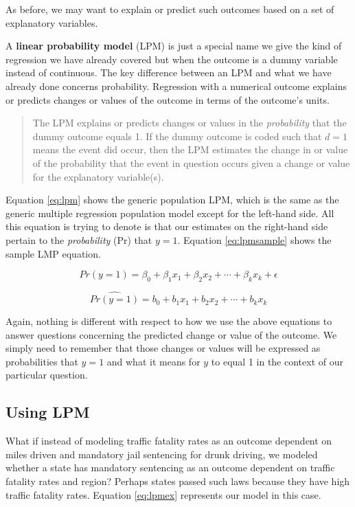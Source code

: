 \documentclass[
]{book}
\begin{document}
As before, we may want to explain or predict such outcomes based on a set of explanatory variables.

A \textbf{linear probability model} (LPM) is just a special name we give the kind of regression we have already covered but when the outcome is a dummy variable instead of continuous. The key difference between an LPM and what we have already done concerns probability. Regression with a numerical outcome explains or predicts changes or values of the outcome in terms of the outcome's units.

\begin{quote}
The LPM explains or predicts changes or values in the \emph{probability} that the dummy outcome equals 1. If the dummy outcome is coded such that \(d=1\) means the event did occur, then the LPM estimates the change in or value of the probability that the event in question occurs given a change or value for the explanatory variable(s).
\end{quote}

Equation \eqref{eq:lpm} shows the generic population LPM, which is the same as the generic multiple regression population model except for the left-hand side. All this equation is trying to denote is that our estimates on the right-hand side pertain to the \emph{probability} (Pr) that \(y=1\). Equation \eqref{eq:lpmsample} shows the sample LMP equation.

\begin{equation}
Pr(y=1)=\beta_0+\beta_1x_1+\beta_2x_2+\cdots+\beta_kx_k+\epsilon
\label{eq:lpm}
\end{equation}

\begin{equation}
\hat{Pr(y=1)}=b_0+b_1x_1+b_2x_2+\cdots +b_kx_k
\label{eq:lpmsample}
\end{equation}

Again, nothing is different with respect to how we use the above equations to answer questions concerning the predicted change or value of the outcome. We simply need to remember that those changes or values will be expressed as probabilities that \(y=1\) and what it means for \(y\) to equal 1 in the context of our particular question.

\hypertarget{using-lpm}{%
\subsection{Using LPM}\label{using-lpm}}

What if instead of modeling traffic fatality rates as an outcome dependent on miles driven and mandatory jail sentencing for drunk driving, we modeled whether a state has mandatory sentencing as an outcome dependent on traffic fatality rates and region? Perhaps states passed such laws because they have high traffic fatality rates. Equation \eqref{eq:lpmex} represents our model in this case.
\end{document}

